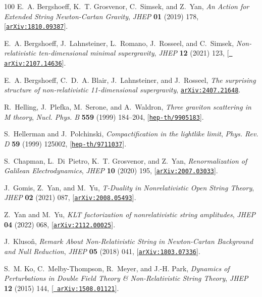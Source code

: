 \documentclass[11pt]{article}
\begin{document}
\begin{thebibliography}{100}
E.~A. Bergshoeff, K.~T. Grosvenor, C.~Simsek, and Z.~Yan, {\it {An Action for
  Extended String Newton-Cartan Gravity}},  {\em JHEP} {\bf 01} (2019) 178,
  [\href{http://arxiv.org/abs/1810.09387}{{\tt arXiv:1810.09387}}].

E.~A. Bergshoeff, J.~Lahnsteiner, L.~Romano, J.~Rosseel, and C.~Simsek, {\it
  {Non-relativistic ten-dimensional minimal supergravity}},  {\em JHEP} {\bf
  12} (2021) 123, [\href{http://arxiv.org/abs/2107.14636}{{\tt
  arXiv:2107.14636}}].

E.~A. Bergshoeff, C.~D.~A. Blair, J.~Lahnsteiner, and J.~Rosseel, {\it {The
  surprising structure of non-relativistic 11-dimensional supergravity}},
  \href{http://arxiv.org/abs/2407.21648}{{\tt arXiv:2407.21648}}.

R.~Helling, J.~Plefka, M.~Serone, and A.~Waldron, {\it {Three graviton
  scattering in M theory}},  {\em Nucl. Phys. B} {\bf 559} (1999) 184--204,
  [\href{http://arxiv.org/abs/hep-th/9905183}{{\tt hep-th/9905183}}].

S.~Hellerman and J.~Polchinski, {\it {Compactification in the lightlike
  limit}},  {\em Phys. Rev. D} {\bf 59} (1999) 125002,
  [\href{http://arxiv.org/abs/hep-th/9711037}{{\tt hep-th/9711037}}].

S.~Chapman, L.~Di~Pietro, K.~T. Grosvenor, and Z.~Yan, {\it {Renormalization of
  Galilean Electrodynamics}},  {\em JHEP} {\bf 10} (2020) 195,
  [\href{http://arxiv.org/abs/2007.03033}{{\tt arXiv:2007.03033}}].

J.~Gomis, Z.~Yan, and M.~Yu, {\it {T-Duality in Nonrelativistic Open String
  Theory}},  {\em JHEP} {\bf 02} (2021) 087,
  [\href{http://arxiv.org/abs/2008.05493}{{\tt arXiv:2008.05493}}].

Z.~Yan and M.~Yu, {\it {KLT factorization of nonrelativistic string
  amplitudes}},  {\em JHEP} {\bf 04} (2022) 068,
  [\href{http://arxiv.org/abs/2112.00025}{{\tt arXiv:2112.00025}}].

J.~Kluso\v{n}, {\it {Remark About Non-Relativistic String in Newton-Cartan
  Background and Null Reduction}},  {\em JHEP} {\bf 05} (2018) 041,
  [\href{http://arxiv.org/abs/1803.07336}{{\tt arXiv:1803.07336}}].

S.~M. Ko, C.~Melby-Thompson, R.~Meyer, and J.-H. Park, {\it {Dynamics of
  Perturbations in Double Field Theory \& Non-Relativistic String Theory}},
  {\em JHEP} {\bf 12} (2015) 144, [\href{http://arxiv.org/abs/1508.01121}{{\tt
  arXiv:1508.01121}}].


\end{thebibliography}
\end{document}
